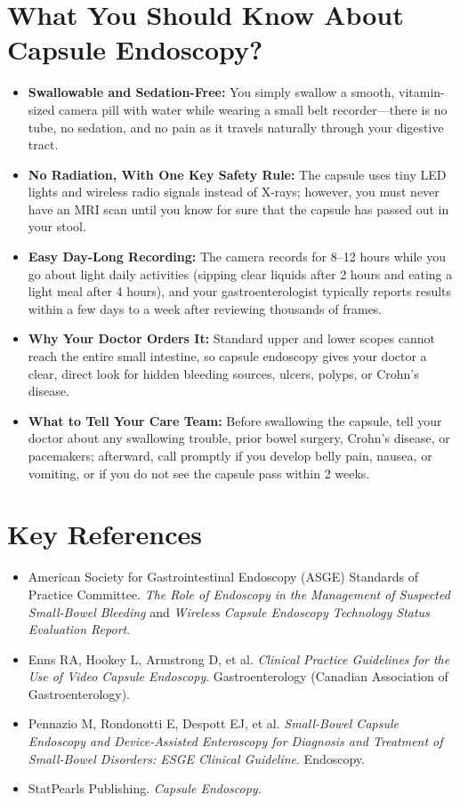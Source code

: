 \section{What You Should Know About Capsule Endoscopy?}
\begin{itemize}
    \item \textbf{Swallowable and Sedation-Free:} You simply swallow a smooth, vitamin-sized camera pill with water while wearing a small belt recorder---there is no tube, no sedation, and no pain as it travels naturally through your digestive tract.
    \item \textbf{No Radiation, With One Key Safety Rule:} The capsule uses tiny LED lights and wireless radio signals instead of X-rays; however, you must never have an MRI scan until you know for sure that the capsule has passed out in your stool.
    \item \textbf{Easy Day-Long Recording:} The camera records for 8--12 hours while you go about light daily activities (sipping clear liquids after 2 hours and eating a light meal after 4 hours), and your gastroenterologist typically reports results within a few days to a week after reviewing thousands of frames.
    \item \textbf{Why Your Doctor Orders It:} Standard upper and lower scopes cannot reach the entire small intestine, so capsule endoscopy gives your doctor a clear, direct look for hidden bleeding sources, ulcers, polyps, or Crohn's disease.
    \item \textbf{What to Tell Your Care Team:} Before swallowing the capsule, tell your doctor about any swallowing trouble, prior bowel surgery, Crohn's disease, or pacemakers; afterward, call promptly if you develop belly pain, nausea, or vomiting, or if you do not see the capsule pass within 2 weeks.
\end{itemize}

\section{Key References}
\begin{itemize}
    \item American Society for Gastrointestinal Endoscopy (ASGE) Standards of Practice Committee. \textit{The Role of Endoscopy in the Management of Suspected Small-Bowel Bleeding} and \textit{Wireless Capsule Endoscopy Technology Status Evaluation Report}.
    \item Enns RA, Hookey L, Armstrong D, et al. \textit{Clinical Practice Guidelines for the Use of Video Capsule Endoscopy}. Gastroenterology (Canadian Association of Gastroenterology).
    \item Pennazio M, Rondonotti E, Despott EJ, et al. \textit{Small-Bowel Capsule Endoscopy and Device-Assisted Enteroscopy for Diagnosis and Treatment of Small-Bowel Disorders: ESGE Clinical Guideline}. Endoscopy.
    \item StatPearls Publishing. \textit{Capsule Endoscopy}.
\end{itemize}
